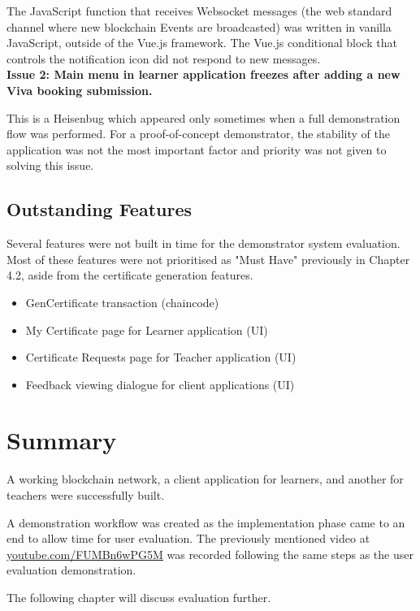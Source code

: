 The JavaScript function that receives Websocket messages (the web standard channel where new 
blockchain Events are broadcasted) was written in vanilla JavaScript, outside of the Vue.js 
framework. The Vue.js conditional block that controls the notification icon did not respond to new messages.
\vspace{0.25cm}\\
\textbf{Issue 2: Main menu in learner application freezes after adding a new Viva booking submission.}

This is a Heisenbug which appeared only sometimes when a full demonstration flow was performed. 
For a proof-of-concept demonstrator, the stability of the application was not the most important factor 
and priority was not given to solving this issue.

\subsection{Outstanding Features}

Several features were not built in time for the demonstrator system evaluation.
Most of these features were not prioritised as "Must Have" previously in Chapter 4.2, 
aside from the certificate generation features.

\begin{itemize}
	\setlength\itemsep{0em}	
	\item GenCertificate transaction (chaincode)
	\item My Certificate page for Learner application (UI)
	\item Certificate Requests page for Teacher application (UI)	
	\item Feedback viewing dialogue for client applications (UI)
\end{itemize}

\section*{Summary}

A working blockchain network, a client application for learners, and another for teachers 
were successfully built. 

A demonstration workflow was created as the implementation phase came to an end to allow 
time for user evaluation. The previously mentioned video at 
\href{https://youtu.be/FUMBn6wPG5M}{\underline{youtube.com/FUMBn6wPG5M}} 
was recorded following the same steps as the user evaluation demonstration.

The following chapter will discuss evaluation further.